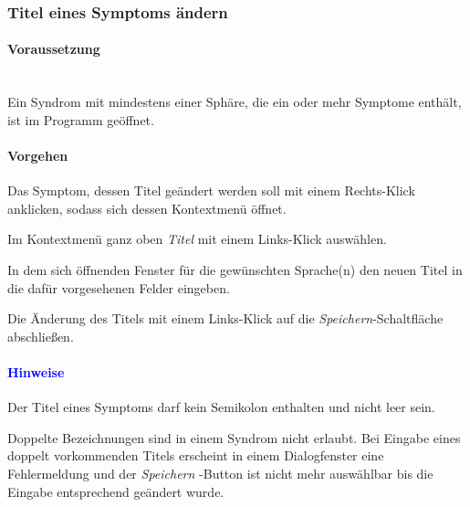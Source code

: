 \documentclass[enabledeprecatedfontcommands,fontsize=11pt,paper=a4,twoside]{scrartcl}
\newcounter{one}
\newcounter{two}[one]
\newcommand*{\hint}{\paragraph{\textcolor{blue}{Hinweise}}}
\newcommand*{\condition}{\paragraph{Voraussetzung}$\;$ \vspace{0.2cm}\\}
\newcommand*{\action}{\paragraph{Vorgehen}}
\let\tempone\itemize
\let\temptwo\enditemize
\renewenvironment{itemize}{\tempone\addtolength{\itemsep}{-10.0pt}}{\temptwo}
\let\origenumerate\enumerate
\let\origendenumerate\endenumerate
\renewenvironment{enumerate}{\origenumerate \addtolength{\itemsep}{-10.0pt}}{\origendenumerate}
\begin{document}
\subsubsection{Titel eines Symptoms ändern}
		\condition 	
		Ein Syndrom mit mindestens einer Sphäre, die ein oder mehr Symptome enthält, ist im Programm geöffnet. 
		\action 
		\begin{enumerate}
			\item Das Symptom, dessen Titel geändert werden soll mit einem Rechts-Klick anklicken, sodass sich dessen Kontextmenü öffnet.
			\item Im Kontextmenü ganz oben \textit{Titel} mit einem Links-Klick auswählen. 
			\item In dem sich öffnenden Fenster für die gewünschten Sprache(n) den neuen Titel in die dafür vorgesehenen Felder eingeben.
			\item Die Änderung des Titels mit einem Links-Klick auf die \textit{Speichern}-Schaltfläche abschließen.
		\end{enumerate}
		\hint
		\begin{itemize}
			\item Der Titel eines Symptoms darf kein Semikolon enthalten und nicht leer sein. 
			\item Doppelte Bezeichnungen sind in einem Syndrom nicht erlaubt. Bei Eingabe eines doppelt vorkommenden Titels erscheint in einem Dialogfenster eine Fehlermeldung und der \textit{Speichern} -Button ist nicht mehr auswählbar bis die Eingabe entsprechend geändert wurde. \\
		\end{itemize}
			
\end{document}
